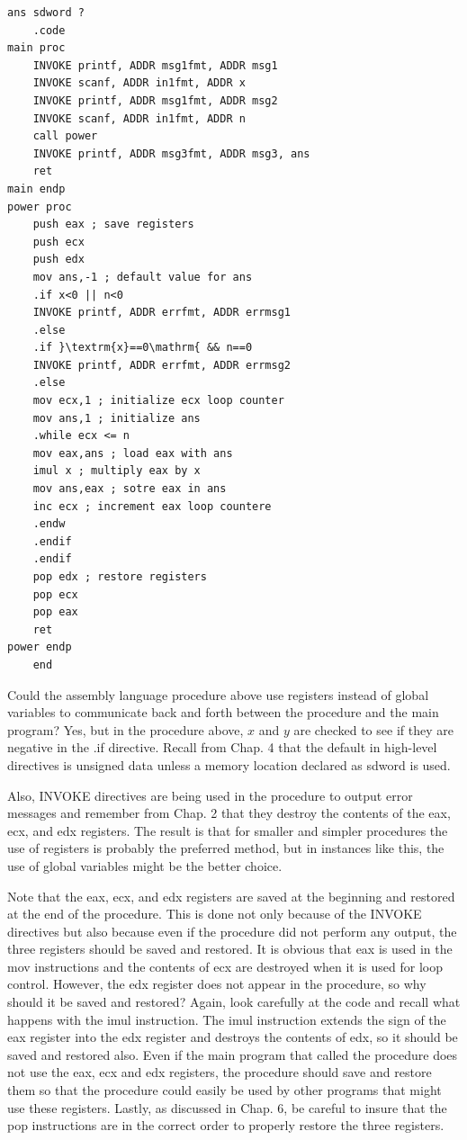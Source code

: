 \documentclass[10pt]{article}
\begin{document}
\begin{verbatim}
ans sdword ?
    .code
main proc
    INVOKE printf, ADDR msg1fmt, ADDR msg1
    INVOKE scanf, ADDR in1fmt, ADDR x
    INVOKE printf, ADDR msg1fmt, ADDR msg2
    INVOKE scanf, ADDR in1fmt, ADDR n
    call power
    INVOKE printf, ADDR msg3fmt, ADDR msg3, ans
    ret
main endp
power proc
    push eax ; save registers
    push ecx
    push edx
    mov ans,-1 ; default value for ans
    .if x<0 || n<0
    INVOKE printf, ADDR errfmt, ADDR errmsg1
    .else
    .if }\textrm{x}==0\mathrm{ && n==0
    INVOKE printf, ADDR errfmt, ADDR errmsg2
    .else
    mov ecx,1 ; initialize ecx loop counter
    mov ans,1 ; initialize ans
    .while ecx <= n
    mov eax,ans ; load eax with ans
    imul x ; multiply eax by x
    mov ans,eax ; sotre eax in ans
    inc ecx ; increment eax loop countere
    .endw
    .endif
    .endif
    pop edx ; restore registers
    pop ecx
    pop eax
    ret
power endp
    end
\end{verbatim}

Could the assembly language procedure above use registers instead of global variables to communicate back and forth between the procedure and the main program? Yes, but in the procedure above, $x$ and $y$ are checked to see if they are negative in the .if directive. Recall from Chap. 4 that the default in high-level directives is unsigned data unless a memory location declared as sdword is used.

Also, INVOKE directives are being used in the procedure to output error messages and remember from Chap. 2 that they destroy the contents of the eax, ecx, and edx registers. The result is that for smaller and simpler procedures the use of registers is probably the preferred method, but in instances like this, the use of global variables might be the better choice.

Note that the eax, ecx, and edx registers are saved at the beginning and restored at the end of the procedure. This is done not only because of the INVOKE directives but also because even if the procedure did not perform any output, the three registers should be saved and restored. It is obvious that eax is used in the mov instructions and the contents of ecx are destroyed when it is used for loop control. However, the edx register does not appear in the procedure, so why should it be saved and restored? Again, look carefully at the code and recall what happens with the imul instruction. The imul instruction extends the sign of the eax register into the edx register and destroys the contents of edx, so it should be saved and restored also. Even if the main program that called the procedure does not use the eax, ecx and edx registers, the procedure should save and restore them so that the procedure could easily be used by other programs that might use these registers. Lastly, as discussed in Chap. 6, be careful to insure that the pop instructions are in the correct order to properly restore the three registers.
\end{document}
